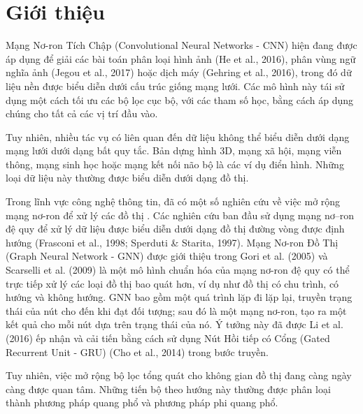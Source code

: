 \chapter{Giới thiệu}
\label{chap:Giới thiệu}


Mạng Nơ-ron Tích Chập (Convolutional Neural Networks - CNN) hiện đang được áp dụng để giải các bài toán phân loại hình ảnh (He et al., 2016), phân vùng ngữ nghĩa ảnh (Jegou et al., 2017) hoặc dịch máy (Gehring et al., 2016), trong đó dữ liệu nền được biểu diễn dưới cấu trúc giống mạng lưới. Các mô hình này tái sử dụng một cách tối ưu các bộ lọc cục bộ, với các tham số học, bằng cách áp dụng chúng cho tất cả các vị trí đầu vào.

Tuy nhiên, nhiều tác vụ có liên quan đến dữ liệu không thể biểu diễn dưới dạng mạng lưới dưới dạng bất quy tắc. Bản dựng hình 3D, mạng xã hội, mạng viễn thông, mạng sinh học hoặc mạng kết nối não bộ là các ví dụ điển hình. Những loại dữ liệu này thường được biểu diễn dưới dạng đồ thị.

Trong lĩnh vực công nghệ thông tin, đã có một số nghiên cứu về việc mở rộng mạng nơ-ron để xử lý các đồ thị . Các nghiên cứu ban đầu sử dụng mạng nơ–ron đệ quy để xử lý dữ liệu được biểu diễn dưới dạng đồ thị đường vòng được định hướng (Frasconi et al., 1998; Sperduti \& Starita, 1997). Mạng Nơ-ron Đồ Thị (Graph Neural Network - GNN) được giới thiệu trong Gori et al. (2005) và Scarselli et al. (2009) là một mô hình chuẩn hóa của mạng nơ-ron đệ quy có thể trực tiếp xử lý các loại đồ thị bao quát hơn, ví dụ như đồ thị có chu trình, có hướng và không hướng. GNN bao gồm một quá trình lặp đi lặp lại, truyền trạng thái của nút cho đến khi đạt đối tượng; sau đó là một mạng nơ-ron, tạo ra một kết quả cho mỗi nút dựa trên trạng thái của nó. Ý tưởng này đã được Li et al. (2016) ếp nhận và cải tiến bằng cách sử dụng Nút Hồi tiếp có Cổng (Gated Recurrent Unit - GRU) (Cho et al., 2014) trong bước truyền.

Tuy nhiên, việc mở rộng bộ lọc tổng quát cho không gian đồ thị đang càng ngày càng được quan tâm. Những tiến bộ theo hướng này thường được phân loại thành phương pháp quang phổ và phương pháp phi quang phổ. 

